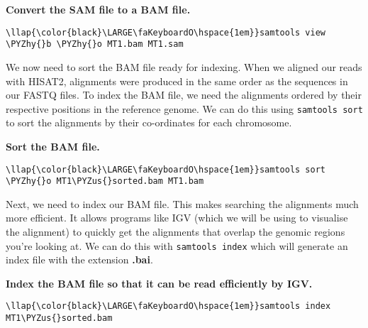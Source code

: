 \documentclass[11pt]{article}
\def\PYZus{\char`\_}
\def\PYZhy{\char`\-}
\begin{document}
    \textbf{Convert the SAM file to a BAM file.}





\begin{terminalinput}
\begin{Verbatim}[commandchars=\\\{\}]
\llap{\color{black}\LARGE\faKeyboardO\hspace{1em}}samtools view \PYZhy{}b \PYZhy{}o MT1.bam MT1.sam
\end{Verbatim}
\end{terminalinput}



    We now need to sort the BAM file ready for indexing. When we aligned our
reads with HISAT2, alignments were produced in the same order as the
sequences in our FASTQ files. To index the BAM file, we need the
alignments ordered by their respective positions in the reference
genome. We can do this using \texttt{samtools\ sort} to sort the
alignments by their co-ordinates for each chromosome.

    \textbf{Sort the BAM file.}





\begin{terminalinput}
\begin{Verbatim}[commandchars=\\\{\}]
\llap{\color{black}\LARGE\faKeyboardO\hspace{1em}}samtools sort \PYZhy{}o MT1\PYZus{}sorted.bam MT1.bam
\end{Verbatim}
\end{terminalinput}



    Next, we need to index our BAM file. This makes searching the alignments
much more efficient. It allows programs like IGV (which we will be using
to visualise the alignment) to quickly get the alignments that overlap
the genomic regions you're looking at. We can do this with
\texttt{samtools\ index} which will generate an index file with the
extension \textbf{.bai}.

    \textbf{Index the BAM file so that it can be read efficiently by IGV.}





\begin{terminalinput}
\begin{Verbatim}[commandchars=\\\{\}]
\llap{\color{black}\LARGE\faKeyboardO\hspace{1em}}samtools index MT1\PYZus{}sorted.bam
\end{Verbatim}
\end{terminalinput}
\end{document}
